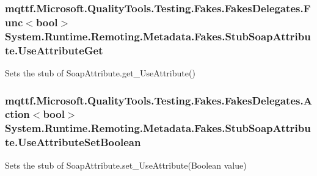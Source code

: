 \hypertarget{class_system_1_1_runtime_1_1_remoting_1_1_metadata_1_1_fakes_1_1_stub_soap_attribute_ad9827bba5db432fa9b6b11a9e9208fae}{
\subsubsection[{Use\-Attribute\-Get}]{\setlength{\rightskip}{0pt plus 5cm}mqttf.\-Microsoft.\-Quality\-Tools.\-Testing.\-Fakes.\-Fakes\-Delegates.\-Func$<$bool$>$ System.\-Runtime.\-Remoting.\-Metadata.\-Fakes.\-Stub\-Soap\-Attribute.\-Use\-Attribute\-Get}}\label{class_system_1_1_runtime_1_1_remoting_1_1_metadata_1_1_fakes_1_1_stub_soap_attribute_ad9827bba5db432fa9b6b11a9e9208fae}


Sets the stub of Soap\-Attribute.\-get\-\_\-\-Use\-Attribute()

\hypertarget{class_system_1_1_runtime_1_1_remoting_1_1_metadata_1_1_fakes_1_1_stub_soap_attribute_ae837d6de4d8b3d72fb2fde99fcb9050d}{
\subsubsection[{Use\-Attribute\-Set\-Boolean}]{\setlength{\rightskip}{0pt plus 5cm}mqttf.\-Microsoft.\-Quality\-Tools.\-Testing.\-Fakes.\-Fakes\-Delegates.\-Action$<$bool$>$ System.\-Runtime.\-Remoting.\-Metadata.\-Fakes.\-Stub\-Soap\-Attribute.\-Use\-Attribute\-Set\-Boolean}}\label{class_system_1_1_runtime_1_1_remoting_1_1_metadata_1_1_fakes_1_1_stub_soap_attribute_ae837d6de4d8b3d72fb2fde99fcb9050d}


Sets the stub of Soap\-Attribute.\-set\-\_\-\-Use\-Attribute(\-Boolean value)

